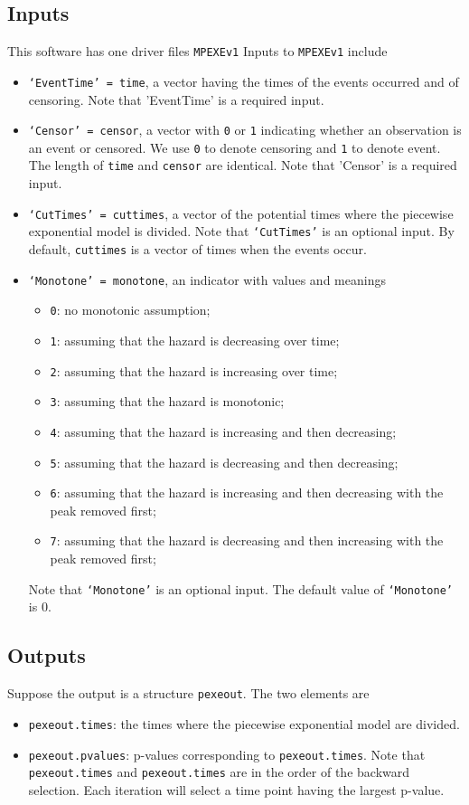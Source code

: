 \documentclass[12pt] {article}
\begin{document}
\subsection{Inputs}
This software has one driver files {\tt MPEXEv1}
Inputs to {\tt MPEXEv1} include
\begin{itemize}
\item {\tt `EventTime' = time}, a vector having the times of the
events occurred and of censoring. Note that 'EventTime' is a
required input.
\item {\tt `Censor' = censor}, a vector with {\tt 0} or {\tt 1}
indicating whether an observation is an event or censored. We
use {\tt 0} to denote censoring and {\tt 1} to denote event. The length
of {\tt time} and {\tt censor} are identical. Note that 'Censor'
is a required input.
\item {\tt `CutTimes' = cuttimes}, a vector of the potential
times where the piecewise exponential model is divided. Note that
{\tt `CutTimes'} is an optional input. By default,
{\tt cuttimes} is a vector of times when the events occur.
\item {\tt `Monotone' = monotone}, an indicator with values
and meanings
\begin{itemize}
\item {\tt 0}: no monotonic assumption;
\item {\tt 1}: assuming that the hazard is decreasing over time;
\item {\tt 2}: assuming that the hazard is increasing over time;
\item {\tt 3}: assuming that the hazard is monotonic;
\item {\tt 4}: assuming that the hazard is increasing and then decreasing;
\item {\tt 5}: assuming that the hazard is decreasing and then decreasing;
\item {\tt 6}: assuming that the hazard is increasing and then decreasing with the peak removed first;
\item {\tt 7}: assuming that the hazard is decreasing and then increasing with the peak removed first;
\end{itemize}
Note that {\tt `Monotone'} is an optional input. The default value of {\tt `Monotone'} is $0.$
\end{itemize}
\subsection{Outputs}
Suppose the output is a structure {\tt pexeout}. The two elements are
\begin{itemize}
\item {\tt pexeout.times}: the times where the piecewise exponential model
are divided.
\item {\tt pexeout.pvalues}: p-values corresponding to {\tt pexeout.times}.
Note that {\tt pexeout.times} and {\tt pexeout.times} are in the order of
the backward selection. Each iteration will select a time point having the
largest p-value.
\end{itemize}
\newpage
\end{document}
